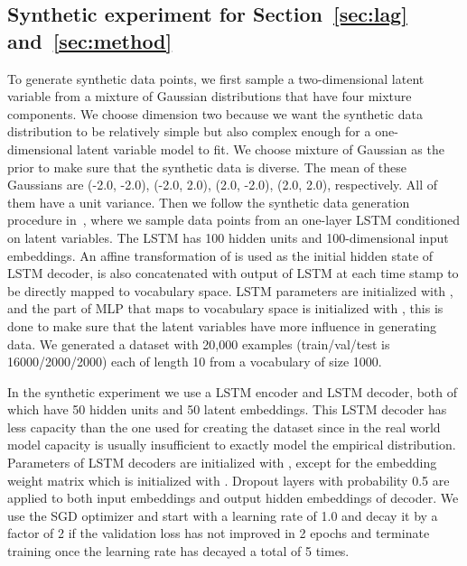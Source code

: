 \documentclass{article} \usepackage{iclr2019_conference,times}
\begin{document}
\subsection{Synthetic experiment for Section~\ref{sec:lag} and~\ref{sec:method}}\label{apdix:synthetic}
To generate synthetic data points, we first sample a two-dimensional latent variable  from a mixture of Gaussian distributions that have four mixture components. We choose dimension two because we want the synthetic data distribution to be relatively simple but also complex enough for a one-dimensional latent variable model to fit. We choose mixture of Gaussian as the prior to make sure that the synthetic data is diverse. The mean of these Gaussians are (-2.0, -2.0), (-2.0, 2.0), (2.0, -2.0), (2.0, 2.0), respectively. All of them have a unit variance. Then we follow the synthetic data generation procedure in~\citet{kim2018semi}, where we sample data points from an one-layer LSTM conditioned on latent variables. The LSTM has 100 hidden units and 100-dimensional input embeddings. An affine transformation of  is used as the initial hidden state of LSTM decoder,  is also concatenated with output of LSTM at each time stamp to be directly mapped to vocabulary space. LSTM parameters are initialized with , and the part of MLP that maps  to vocabulary space is initialized with , this is done to  make sure that the latent variables have more influence in generating data. We generated a dataset with 20,000 examples (train/val/test is 16000/2000/2000) each of length 10 from a vocabulary of size 1000.

In the synthetic experiment we use a LSTM encoder and LSTM decoder, both of which have 50 hidden units and 50 latent embeddings. This LSTM decoder has less capacity than the one used for creating the dataset since in the real world model capacity is usually insufficient to exactly model the empirical distribution. Parameters of LSTM decoders are initialized with , except for the embedding weight matrix which is initialized with . Dropout layers with probability 0.5 are applied to both input embeddings and output hidden embeddings of decoder. We use the SGD optimizer and start with a learning rate of 1.0 and decay it by a factor of 2 if the validation loss has not improved in 2 epochs and terminate training once the learning rate has decayed a total of 5 times. 
\end{document}

